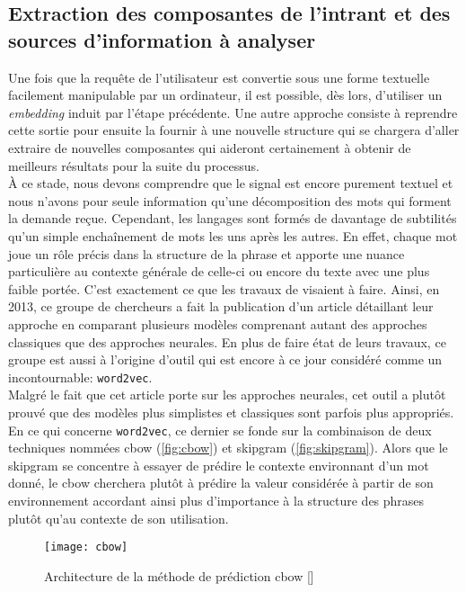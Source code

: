 \subsection{Extraction des composantes de l'intrant et des sources d'information à analyser}
\label{devel:embedding}
Une fois que la requête de l'utilisateur est convertie sous une forme textuelle facilement manipulable par un ordinateur, il est possible, dès lors, d'utiliser un \textit{embedding} induit par l'étape précédente. Une autre approche consiste à reprendre cette sortie pour ensuite la fournir à une nouvelle structure qui se chargera d'aller extraire de nouvelles composantes qui aideront certainement à obtenir de meilleurs résultats pour la suite du processus. \\

À ce stade, nous devons comprendre que le signal est encore purement textuel et nous n'avons pour seule information qu'une décomposition des mots qui forment la demande reçue. Cependant, les langages sont formés de davantage de subtilités qu'un simple enchaînement de mots les uns après les autres. En effet, chaque mot joue un rôle précis dans la structure de la phrase et apporte une nuance particulière au contexte générale de celle-ci ou encore du texte avec une plus faible portée. C'est exactement ce que les travaux de \cite{word2vec} visaient à faire. Ainsi, en 2013, ce groupe de chercheurs a fait la publication d'un article détaillant leur approche en comparant plusieurs modèles comprenant autant des approches classiques que des approches neurales. En plus de faire état de leurs travaux, ce groupe est aussi à l'origine d'outil qui est encore à ce jour considéré comme un incontournable: \texttt{word2vec}. \\

Malgré le fait que cet article porte sur les approches neurales, cet outil a plutôt prouvé que des modèles plus simplistes et classiques sont parfois plus appropriés. En ce qui concerne \texttt{word2vec}, ce dernier se fonde sur la combinaison de deux techniques nommées \gls{cbow} (\autoref{fig:cbow}) et \gls{skipgram} (\autoref{fig:skipgram}). Alors que le \gls{skipgram} se concentre à essayer de prédire le contexte environnant d'un mot donné, le \gls{cbow} cherchera plutôt à prédire la valeur considérée à partir de son environnement accordant ainsi plus d’importance à la structure des phrases plutôt qu’au contexte de son utilisation.\\

\begin{figure}[ht]
  \centering
  \texttt{[image: cbow]}
  \caption{Architecture de la méthode de prédiction \gls{cbow} []}
  \label{fig:cbow}
\end{figure}

